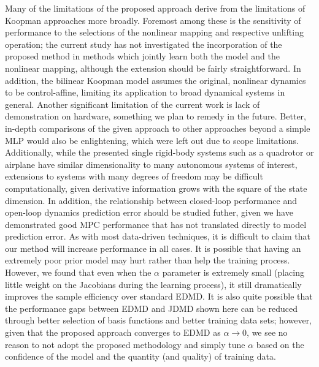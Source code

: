 \documentclass[../root.tex]{subfiles}
\newcommand{\changed}[1]{{\color{black} #1}}
\begin{document}
\changed{Many of the limitations of the proposed approach derive from the limitations of
Koopman approaches more broadly. Foremost among these is the sensitivity of performance to the selections 
of the nonlinear mapping and respective unlifting operation; the current study has not 
investigated the incorporation of the proposed method in methods which jointly learn both the 
model and the nonlinear mapping, although the extension should be fairly straightforward. 
In addition, the bilinear Koopman model
assumes the original, nonlinear dynamics to be control-affine, limiting its application
to broad dynamical systems in general.
Another significant limitation of the current work is lack of demonstration on hardware,
something we plan to remedy in the future. Better, in-depth comparisons of the given
approach to other approaches beyond a simple MLP would also be enlightening, which were
left out due to scope limitations. Additionally, while the presented single rigid-body
systems such as a quadrotor or airplane have similar dimensionality to many autonomous
systems of interest, extensions to systems with many degrees of freedom may be difficult
computationally, given derivative information grows with the square of the state dimension.
In addition, the relationship between closed-loop performance and open-loop dynamics prediction 
error should be studied futher, given we have demonstrated good MPC performance
that has not translated directly to model prediction error.} 
As with most data-driven techniques, it is difficult to claim that our
method will increase performance in all cases. It is possible that having an extremely poor
prior model may hurt rather than help the training process. However, we found that even
when the $\alpha$ parameter is extremely small (placing little weight on the Jacobians 
during the learning process), it still dramatically improves the sample efficiency over 
standard EDMD. It is also quite possible that the performance gaps between EDMD and JDMD
shown here can be reduced through better selection of basis functions and better training
data sets; however, given that the proposed approach converges to EDMD as $\alpha
\rightarrow 0$, we see no reason to not adopt the proposed methodology and simply tune
$\alpha$ based on the confidence of the model and the quantity (and quality) of training
data. 

\end{document}
